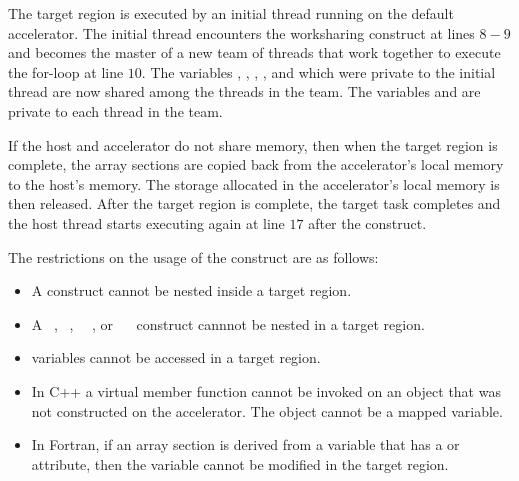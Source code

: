 The target region is executed by an initial thread running on the default
accelerator.  The initial thread encounters the 
worksharing construct at lines $8-9$ and becomes the master of a new team of
threads that work together to execute the for-loop at line $10$.  
The variables , , , , and  which were private to the initial
thread are now shared among the threads in the team.  The variables  and
 are private to each thread in the team.

If the host and accelerator do not share memory, then when the target region is
complete, the array sections are copied back from the accelerator's local
memory to the host's memory.  The storage allocated in the accelerator's local
memory is then released.  After the target region is complete, the target task
completes and the host thread starts executing again at line $17$ after the
 construct.

The restrictions on the usage of the  construct are as follows:

\begin{itemize}

\item A  construct cannot be nested inside a target region.

\item A ~, ~, ~~, or ~~ construct cannnot be nested in a target region.

\item {} variables cannot be accessed in a target region.

\item In C++ a virtual member function cannot be invoked on an object that was
not constructed on the accelerator.  The object cannot be a mapped variable.

\item In Fortran, if an array section is derived from a variable that has a
 or  attribute, then the variable cannot be
modified in the target region.

\end{itemize}


